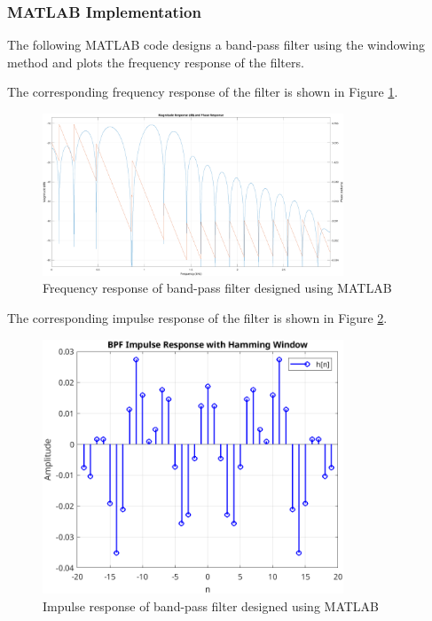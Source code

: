 \documentclass[a4paper,12pt]{article}
\begin{document}
\subsubsection*{MATLAB Implementation}
The following MATLAB code designs a band-pass filter
using the windowing method and plots the frequency response of the filters.



The corresponding frequency response of the filter is shown in Figure \ref{fig:bandpass-matlab}.
\begin{figure}[ht]
    \centering
    \includegraphics[width=0.8\textwidth]{./figs/BPF_freq.png}
    \caption{Frequency response of band-pass filter designed using MATLAB}
    \label{fig:bandpass-matlab}
\end{figure}

\newpage

The corresponding impulse response of the filter is shown in Figure \ref{fig:bandpass-impulse}.

\begin{figure}[ht]
    \centering
    \includegraphics[width=0.8\textwidth]{./figs/BPF_impulse.png}
    \caption{Impulse response of band-pass filter designed using MATLAB}
    \label{fig:bandpass-impulse}
\end{figure}
\end{document}
